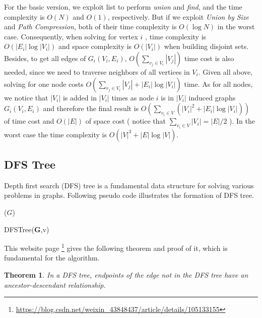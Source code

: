 \documentclass{article}
\newtheorem{theorem}{Theorem}[section]
\begin{document}
	For the basic version, we exploit list to perform \textit{union} and \textit{find}, and the time complexity is $O(N)$ and $O(1)$, respectively. But if we exploit \textit{Union by Size} and \textit{Path Compression}, both of their time complexity is $O(\log N)$ in the worst case. Consequently, when solving for vertex $i$ , time complexity is $O(|E_i| \log |V_i|)$ and space complexity is $O(|V_i|)$ when building disjoint sets. Besides, to get all edges of $G_i(V_i, E_i)$, $O(\sum_{v_j \in V_i}^{} |V_j|)$ time cost is also needed, since we need to traverse neighbors of all vertices in $V_i$. Given all above, solving for one node costs $O( \sum_{v_j \in V_i}^{} |V_j| + |E_i| \log |V_i|)$ time. As for all nodes, we notice that $|V_i|$ is added in $|V_i|$ times as node $i$ is in $|V_i|$ induced graphs $G_i(V_i, E_i)$ and therefore the final result is $O( \sum_{v_i \in V}^{} (|V_i|^2 + |E_i| \log |V_i|))$ of time cost and $O(|E|)$ of space cost ( notice that $\sum_{v_i \in V}^{} |V_i| = |E|/2$ ). In the worst case the time complexity is $O(|V|^3 + |E| \log |V|)$.
	 
	\subsection{DFS Tree}
	Depth first search (DFS) tree is a fundamental data structure for solving various problems in graphs. Following pseudo code illustrates the formation of DFS tree.
	
	
	\begin{algorithm}[H]
		\SetAlgoLined
		
		\BlankLine
		\SetAlgoLined
		\DFS($G$)\;

		\caption{DFSTree(\textbf{G},v)}
	\end{algorithm}
	
	\vspace{1em}
	This website page \footnote{\href{https://blog.csdn.net/weixin_43848437/article/details/105133155}{https://blog.csdn.net/weixin\_43848437/article/details/105133155}} gives the following theorem and proof of it, which is fundamental for the algorithm.
	
	\begin{theorem} \label{thm1}
	In a DFS tree, endpoints of the edge not in the DFS tree have an ancestor-descendant relationship.
	\end{theorem}
	
\end{document}
